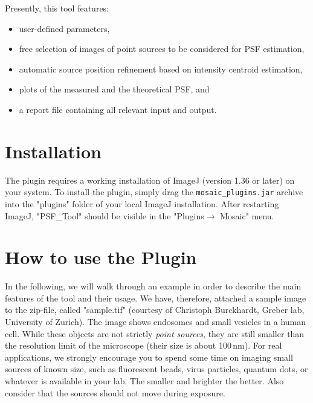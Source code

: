 Presently, this tool features:
%
\begin{itemize}
\item user-defined parameters,\\[-4ex]
\item free selection of images of point sources to be considered for PSF estimation,\\[-4ex]
\item automatic source position refinement based on intensity centroid estimation,\\[-4ex]
\item plots of the measured and the theoretical PSF, and\\[-4ex]
\item a report file containing all relevant input and output.
\end{itemize}

\section{Installation}
The plugin requires a working installation of ImageJ (version 1.36 or later) on your system. To install the plugin, simply drag the \texttt{mosaic\_plugins.jar} archive into the "plugins" folder of your local ImageJ installation. After restarting ImageJ, "PSF\_Tool" should be visible in the "Plugins$\rightarrow$ Mosaic" menu.

\section{How to use the Plugin}
In the following, we will walk through an example in order to describe the main features of the tool and their usage. We have, therefore, attached a sample image to the zip-file, called "sample.tif" (courtesy of Christoph Burckhardt, Greber lab, University of Zurich). The image shows endosomes and small vesicles in a human cell. While these objects are not strictly \emph{point sources}, they are still smaller than the resolution limit of the microscope (their size is about 100\,nm). For real applications, we strongly encourage you to spend some time on imaging small sources of known size, such as fluorescent beads, virus particles, quantum dots, or whatever is available in your lab. The smaller and brighter the better. Also consider that the sources should not move during exposure.

